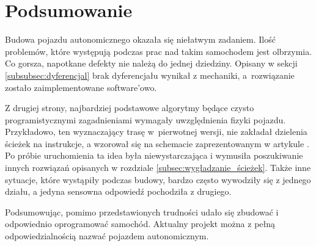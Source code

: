 \section{Podsumowanie}
    Budowa pojazdu autonomicznego okazała się niełatwym zadaniem.
    Ilość problemów, które występują podczas prac nad takim samochodem jest olbrzymia.
    Co gorsza, napotkane defekty nie należą do jednej dziedziny.
    Opisany w sekcji \ref{subsubsec:dyferencjal} brak dyferencjału wynikał z mechaniki, a~rozwiązanie zostało zaimplementowane software'owo.

    Z drugiej strony, najbardziej podstawowe algorytmy będące czysto programistycznymi zagadnieniami wymagały uwzględnienia fizyki pojazdu.
    Przykładowo, ten wyznaczający trasę w~pierwotnej wersji, nie zakładał dzielenia ścieżek na instrukcje, a wzorował się na schemacie zaprezentowanym w artykule \cite{Simple_PathSmoothing}.
    Po próbie uruchomienia ta idea była niewystarczająca i wymusiła poszukiwanie innych rozwiązań opisanych w rozdziale \ref{subsec:wygładzanie_ścieżek}.
    Także inne sytuacje, które wystąpiły podczas budowy, bardzo często wywodziły się z jednego działu, a jedyna sensowna odpowiedź pochodziła z drugiego.

    Podsumowując, pomimo przedstawionych trudności udało się zbudować i odpowiednio oprogramować samochód.
    Aktualny projekt można z pełną odpowiedzialnością nazwać pojazdem autonomicznym.

